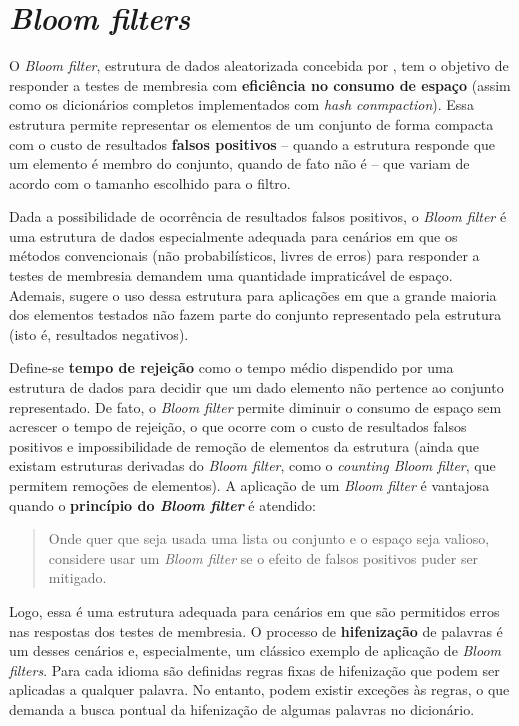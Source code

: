 \documentclass[12pt,twoside,english,brazilian]{article}
\begin{document}
\newpage

\section{\textit{Bloom filters}}

O \textit{Bloom filter}, estrutura de dados aleatorizada concebida por \citet{bloom}, tem o objetivo de responder a testes de membresia com \textbf{eficiência no consumo de espaço} (assim como os dicionários completos implementados com \textit{hash conmpaction}). Essa estrutura permite representar os elementos de um conjunto de forma compacta com o custo de resultados \textbf{falsos positivos} -- quando a estrutura responde que um elemento é membro do conjunto, quando de fato não é -- que variam de acordo com o tamanho escolhido para o filtro.

Dada a possibilidade de ocorrência de resultados falsos positivos, o \textit{Bloom filter} é uma estrutura de dados especialmente adequada para cenários em que os métodos convencionais (não probabilísticos, livres de erros) para responder a testes de membresia demandem uma quantidade impraticável de espaço. Ademais, \citet{bloom} sugere o uso dessa estrutura para aplicações em que a grande maioria dos elementos testados não fazem parte do conjunto representado pela estrutura (isto é, resultados negativos).

Define-se \textbf{tempo de rejeição} como o tempo médio dispendido por uma estrutura de dados para decidir que um dado elemento não pertence ao conjunto representado. De fato, o \textit{Bloom filter} permite diminuir o consumo de espaço sem acrescer o tempo de rejeição, o que ocorre com o custo de resultados falsos positivos e impossibilidade de remoção de elementos da estrutura (ainda que existam estruturas derivadas do \textit{Bloom filter}, como o \textit{counting Bloom filter}, que permitem remoções de elementos). A aplicação de um \textit{Bloom filter} é vantajosa quando o \textbf{princípio do \textit{Bloom filter}} é atendido:

\begin{quote}
Onde quer que seja usada uma lista ou conjunto e o espaço seja valioso, considere usar um \textit{Bloom filter} se o efeito de falsos positivos puder ser mitigado. \citep[tradução nossa]{broder-mitz}
\end{quote}

Logo, essa é uma estrutura adequada para cenários em que são permitidos erros nas respostas dos testes de membresia. O processo de \textbf{hifenização} de palavras é um desses cenários e, especialmente, um clássico exemplo de aplicação de \textit{Bloom filters}. Para cada idioma são definidas regras fixas de hifenização que podem ser aplicadas a qualquer palavra. No entanto, podem existir exceções às regras, o que demanda a busca pontual da hifenização de algumas palavras no dicionário.
\end{document}
